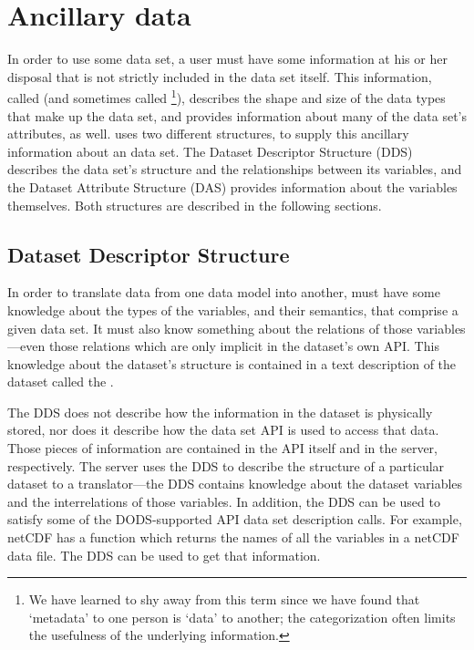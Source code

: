 \section{Ancillary data}
\label{data,ancillary}

In order to use some data set, a user must have some information at
his or her disposal that is not strictly included in the data set
itself. This information, called 
 (and sometimes called \footnote{We
  have learned to shy away from this term since we have found that
  `metadata' to one person is `data' to another; the categorization
  often limits the usefulness of the underlying information.}),
describes the shape and size of the data types that make up the data
set, and provides information about many of the data set's attributes,
as well. \opendap uses two different structures, to supply this ancillary
information about an \opendap data set. The Dataset Descriptor Structure
(DDS) describes the data set's structure and the relationships between
its variables, and the Dataset Attribute Structure (DAS) provides
information about the variables themselves. Both structures are
described in the following sections.

\subsection{Dataset Descriptor Structure}
\label{data,dds}

In order to translate data from one data model into another, \opendap must
have some knowledge about the types of the variables, and their
semantics, that comprise a given data set. It must also know something
about the relations of those variables---even those relations which
are only implicit in the dataset's own API\@. This knowledge about the
dataset's structure is contained in a text description of the dataset
called the .
 

The DDS does not describe how the information in the dataset is
physically stored, nor does it describe how the data set API is used
to access that data. Those pieces of information are contained in the
API itself and in the \opendap server, respectively. The server uses the
DDS to describe the structure of a particular dataset to a
translator---the DDS contains knowledge about the dataset variables
and the interrelations of those variables.  In addition, the DDS can
be used to satisfy some of the DODS-supported API data set description
calls. For example, netCDF has a function which returns the names of
all the variables in a netCDF data file. The DDS can be used to get
that information.


